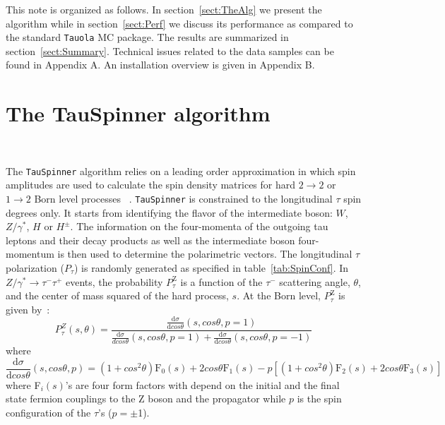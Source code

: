 \documentclass[12pt]{article}
\def\Ztautau{\ensuremath{Z/\gamma^{*}\to\tau^{-}\tau^{+}}\xspace}
\def\Tau{\ensuremath{\tau}\xspace}
\def\TauMin{\ensuremath{\tau^-}\xspace}
\def\PTAUZ{\ensuremath{P_{\tau}^{\mathrm{Z}}}\xspace}
\def\PTAU{\ensuremath{P_{\tau}}\xspace}
\begin{document}
This note is organized as follows.
In section~\ref{sect:TheAlg} we present the algorithm while
in section~\ref{sect:Perf} we discuss its performance as compared to
the standard {\tt Tauola} MC package.
The results are summarized in section~\ref{sect:Summary}. 
Technical issues related to the data samples can be found in Appendix A.
An installation overview is given in Appendix B.


\section{The TauSpinner algorithm}~\label{sect:TheAlg}


The {\tt TauSpinner} algorithm relies on a leading order approximation in which 
spin amplitudes are used to calculate the spin density matrices for hard
$2 \to 2$ or $1 \to 2$ Born level processes
~\cite{TauSpinERWZW,Davidson:2010rw,Jadach:1984iy, Jadach:1993yv, Jadach:1999vf}. 
{\tt TauSpinner} is constrained to the longitudinal \Tau spin degrees only.
It starts from identifying the flavor of
the intermediate boson: $W$, $Z/\gamma^*$, $H$ or $H^\pm$. The information on the four-momenta of the
outgoing tau leptons and their decay products as well as the intermediate
boson four-momentum is then used to determine the polarimetric vectors.
The longitudinal \Tau polarization (\PTAU) is randomly generated as specified in table~\ref{tab:SpinConf}. 
In \Ztautau events, the probability \PTAUZ is a function of the \TauMin scattering angle, $\theta$, and
the center of mass squared of the hard process, $s$. At the Born
level, \PTAUZ is given by~\cite{TauSpinERWZW}:
\begin{equation}\label{eq:1}
P_{\tau}^{Z}(s,\theta)=\frac{\frac{\mathrm{d}\sigma}{\mathrm{d}cos\theta}(s, cos\theta,p=1)}{\frac{\mathrm{d}\sigma}{dcos\theta}(s, cos\theta,p=1)+\frac{\mathrm{d}\sigma}{\mathrm{d}cos\theta}(s, cos\theta,p=-1)}
\end{equation}
where
\begin{equation}\label{eq:2}
\frac{\mathrm{d}\sigma}{\mathrm{d}cos\theta}(s, cos\theta,p)=(1+cos^2\theta)\mathrm{F}_0(s)
+2cos\theta \mathrm{F}_1(s) -p[(1+cos^2\theta)\mathrm{F}_2(s)
+2cos\theta \mathrm{F}_3(s)] 
\end{equation}
where F$_i(s)$'s are four form factors with depend on the initial and
the final state fermion couplings to the Z boson and the propagator
while $p$ is the spin configuration of the \Tau's ($p=\pm$1).
\end{document}
